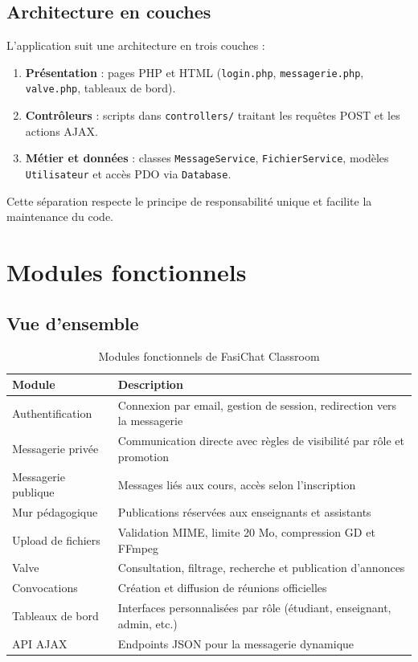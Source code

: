 \documentclass[12pt,a4paper]{article}
\begin{document}
\subsection{Architecture en couches}

L'application suit une architecture en trois couches :

\begin{enumerate}
  \item \textbf{Présentation} : pages PHP et HTML (\texttt{login.php}, \texttt{messagerie.php}, \texttt{valve.php}, tableaux de bord).
  \item \textbf{Contrôleurs} : scripts dans \texttt{controllers/} traitant les requêtes POST et les actions AJAX.
  \item \textbf{Métier et données} : classes \texttt{MessageService}, \texttt{FichierService}, modèles \texttt{Utilisateur} et accès PDO via \texttt{Database}.
\end{enumerate}

Cette séparation respecte le principe de responsabilité unique et facilite la maintenance du code.

\section{Modules fonctionnels}

\subsection{Vue d'ensemble}

\begin{table}[h]
\centering
\begin{tabular}{|l|p{9cm}|}
\hline
\textbf{Module} & \textbf{Description} \\
\hline
Authentification & Connexion par email, gestion de session, redirection vers la messagerie \\
\hline
Messagerie privée & Communication directe avec règles de visibilité par rôle et promotion \\
\hline
Messagerie publique & Messages liés aux cours, accès selon l'inscription \\
\hline
Mur pédagogique & Publications réservées aux enseignants et assistants \\
\hline
Upload de fichiers & Validation MIME, limite 20 Mo, compression GD et FFmpeg \\
\hline
Valve & Consultation, filtrage, recherche et publication d'annonces \\
\hline
Convocations & Création et diffusion de réunions officielles \\
\hline
Tableaux de bord & Interfaces personnalisées par rôle (étudiant, enseignant, admin, etc.) \\
\hline
API AJAX & Endpoints JSON pour la messagerie dynamique \\
\hline
\end{tabular}
\caption{Modules fonctionnels de FasiChat Classroom}
\end{table}
\end{document}
